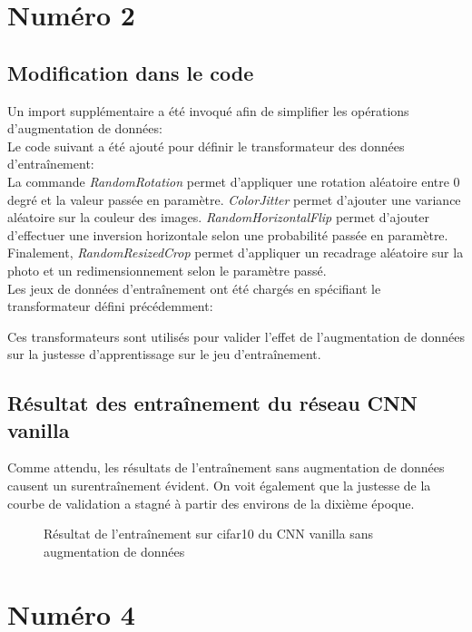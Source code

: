 \section{Numéro 2}

\subsection{Modification dans le code}
    Un import supplémentaire a été invoqué afin de simplifier les opérations d'augmentation de données:\\
    
    Le code suivant a été ajouté pour définir le transformateur des données d'entraînement: \\
    
    La commande \textit{RandomRotation} permet d'appliquer une rotation aléatoire entre 0 degré et la valeur passée en paramètre. \textit{ColorJitter} permet d'ajouter une variance aléatoire sur la couleur des images. \textit{RandomHorizontalFlip} permet d'ajouter d'effectuer une inversion horizontale selon une probabilité passée en paramètre. Finalement, \textit{RandomResizedCrop} permet d'appliquer un recadrage aléatoire sur la photo et un redimensionnement selon le paramètre passé.\\
    
    Les jeux de données d'entraînement ont été chargés en spécifiant le transformateur défini précédemment:    
    
    Ces transformateurs sont utilisés pour valider l'effet de l'augmentation de données sur la justesse d'apprentissage sur le jeu d'entraînement.
    
\subsection{Résultat des entraînement du réseau CNN vanilla}
    Comme attendu, les résultats de l'entraînement sans augmentation de données causent un surentraînement évident. On voit également que la justesse de la courbe de validation a stagné à partir des environs de la dixième époque.
    \begin{figure}[H]
        \centering 
        \caption{Résultat de l'entraînement sur cifar10 du CNN vanilla sans augmentation de données}
    \end{figure}

\pagebreak
\section{Numéro 4}
